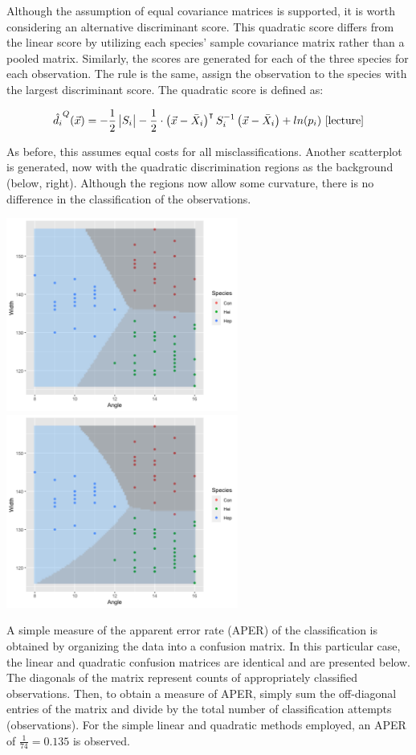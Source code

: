 \begin{enumerate}
	Although the assumption of equal covariance matrices is supported, it is worth considering an alternative discriminant score. This quadratic score differs from the linear score by utilizing each species' sample covariance matrix rather than a pooled matrix. Similarly, the scores are generated for each of the three species for each observation. The rule is the same, assign the observation to the species with the largest discriminant score. The quadratic score is defined as:

	$$\hat{d_i}^Q(\vec{x}) = -\frac{1}{2} \md{S_i} -\frac{1}{2} \cdot \p{\vec{x} - \bar{X}_i}^{\intercal} S_i^{-1} \p{\vec{x} - \bar{X}_i} + ln(p_i)\ \cite[Lecture~25]{lecture}$$

	As before, this assumes equal costs for all misclassifications. Another scatterplot is generated, now with the quadratic discrimination regions as the background (below, right). Although the regions now allow some curvature, there is no difference in the classification of the observations.

\begin{center}
	\includegraphics[width=3.0in]{1_e_linear.png}
	\includegraphics[width=3.0in]{1_e_quadratic.png}
\end{center}

	A simple measure of the apparent error rate (APER) of the classification is obtained by organizing the data into a confusion matrix. In this particular case, the linear and quadratic confusion matrices are identical and are presented below. The diagonals of the matrix represent counts of appropriately classified observations. Then, to obtain a measure of APER, simply sum the off-diagonal entries of the matrix and divide by the total number of classification attempts (observations). For the simple linear and quadratic methods employed, an APER of $\frac{1}{74}=0.135$ is observed.


\end{enumerate}
